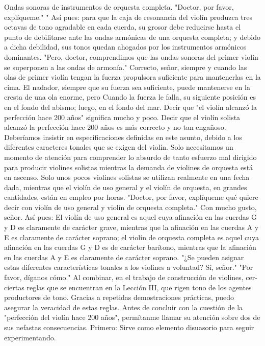 Ondas sonoras de instrumentos de orquesta completa. "Doctor, por favor, explíqueme."
"
Así pues: para que la caja de resonancia del violín produzca tres octavas de tono agradable en cada cuerda, su grosor debe reducirse hasta el punto de debilitarse ante las ondas armónicas de una orquesta completa; y debido a dicha debilidad, sus tonos quedan ahogados por los instrumentos armónicos dominantes.
"Pero, doctor, comprendimos que las ondas sonoras del primer violín se superponen a las ondas de armonía."
Correcto, señor, siempre y cuando las olas de primer violín tengan la fuerza propulsora suficiente para mantenerlas en la cima. El nadador, siempre que su fuerza sea suficiente, puede mantenerse en la cresta de una ola enorme, pero
Cuando la fuerza le falla, su siguiente posición es en el fondo del abismo; luego, en el fondo del mar. Decir que "el violín alcanzó la perfección hace 200 años" significa mucho y poco. Decir que el violín solista alcanzó la perfección hace 200 años es más correcto y no tan engañoso. Deberíamos insistir en especificaciones definidas en este asunto, debido a los diferentes caracteres tonales que se exigen del violín. Solo necesitamos un momento de atención para comprender lo absurdo de tanto esfuerzo mal dirigido para producir violines solistas mientras la demanda de violines de orquesta está en ascenso. Solo unos pocos violines solistas se utilizan realmente en una fecha dada, mientras que el violín de uso general y el violín de orquesta, en grandes cantidades, están en
empleo por horas. "Doctor, por favor, explíqueme qué quiere decir con violín de uso general y violín de orquesta completa." Con mucho gusto, señor.
Así pues: El violín de uso general es aquel cuya afinación en las cuerdas G y D es claramente de carácter grave, mientras que la afinación en las cuerdas A y E es claramente de carácter soprano; el violín de orquesta completa es aquel cuya afinación en las cuerdas G y D es de carácter barítono, mientras que la afinación en las cuerdas A y E es claramente de carácter soprano. "¿Se pueden asignar estas diferentes características tonales a los violines a voluntad? Sí, señor."
"Por favor, díganos cómo."
Al combinar, en el trabajo de construcción de violines, cer-
ciertas reglas que se encuentran en la Lección III, que rigen
tono de los agentes productores de tono.
Gracias a repetidas demostraciones prácticas, puedo asegurar la veracidad de estas reglas. Antes de concluir con la cuestión de la "perfección del violín hace 200 años", permítanme llamar su atención sobre dos de sus nefastas consecuencias.
Primero: Sirve como elemento disuasorio para seguir experimentando.
